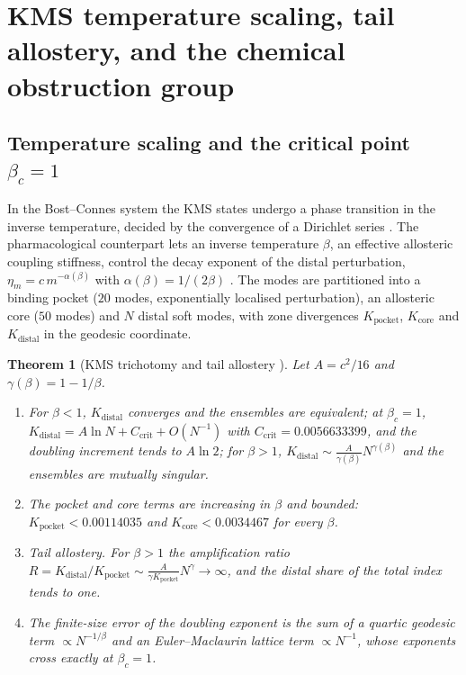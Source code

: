 \documentclass[11pt,reqno]{amsart}
\theoremstyle{plain}
\newtheorem{theorem}{Theorem}[section]
\theoremstyle{definition}
\theoremstyle{remark}
\numberwithin{equation}{section}
\begin{document}
\section{KMS temperature scaling, tail allostery, and the chemical obstruction group}
\label{sec:kms}

\subsection*{Temperature scaling and the critical point $\beta_c=1$}
In the Bost--Connes system the KMS states undergo a phase transition in the inverse temperature, decided by the convergence of a Dirichlet series \cite{BostConnes1995,HHW1967,BratteliRobinson1997}. The pharmacological counterpart lets an inverse temperature $\beta$, an effective allosteric coupling stiffness, control the decay exponent of the distal perturbation, $\eta_m=c\,m^{-\alpha(\beta)}$ with $\alpha(\beta)=1/(2\beta)$ \cite{ChenChen2026IV}. The modes are partitioned into a binding pocket ($20$ modes, exponentially localised perturbation), an allosteric core ($50$ modes) and $N$ distal soft modes, with zone divergences $K_{\mathrm{pocket}}$, $K_{\mathrm{core}}$ and $K_{\mathrm{distal}}$ in the geodesic coordinate.

\begin{theorem}[KMS trichotomy and tail allostery \cite{ChenChen2026IV}]\label{thm:kms}
Let $A=c^2/16$ and $\gamma(\beta)=1-1/\beta$.
\begin{enumerate}[label=\textup{(\arabic*)},leftmargin=*]
\item For $\beta<1$, $K_{\mathrm{distal}}$ converges and the ensembles are equivalent; at $\beta_c=1$, $K_{\mathrm{distal}}=A\ln N+C_{\mathrm{crit}}+O(N^{-1})$ with $C_{\mathrm{crit}}=0.0056633399$, and the doubling increment tends to $A\ln2$; for $\beta>1$, $K_{\mathrm{distal}}\sim\frac A{\gamma(\beta)}N^{\gamma(\beta)}$ and the ensembles are mutually singular.
\item The pocket and core terms are increasing in $\beta$ and bounded: $K_{\mathrm{pocket}}<0.00114035$ and $K_{\mathrm{core}}<0.0034467$ for every $\beta$.
\item \emph{Tail allostery.} For $\beta>1$ the amplification ratio $R=K_{\mathrm{distal}}/K_{\mathrm{pocket}}\sim\frac{A}{\gamma K_{\mathrm{pocket}}}N^{\gamma}\to\infty$, and the distal share of the total index tends to one.
\item The finite-size error of the doubling exponent is the sum of a quartic geodesic term $\propto N^{-1/\beta}$ and an Euler--Maclaurin lattice term $\propto N^{-1}$, whose exponents cross exactly at $\beta_c=1$.
\end{enumerate}
\end{theorem}
\end{document}
